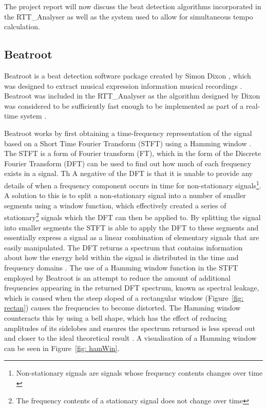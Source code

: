 \documentclass[a4paper, 11pt]{article}
\begin{document}
The project report will now discuss the beat detection algorithms incorporated in the RTT\_Analyser as well as the system used to allow for simultaneous tempo calculation.  

\subsection{Beatroot}
Beatroot is a beat detection software package created by Simon Dixon \cite{dixon1}, which was designed to extract musical expression information musical recordings \cite{dixon3}. Beatroot was included in the RTT{\_}Analyser as the algorithm designed by Dixon was considered to be sufficiently fast enough to be implemented as part of a real-time system \cite{dixon4}.\par

Beatroot works by first obtaining a time-frequency representation of the signal based on a Short Time Fourier Transform (STFT) using a Hamming window \cite{dixon2}. The STFT is a form of Fourier transform (FT), which in the form of the Discrete Fourier Transform (DFT) can be used to find out how much of each frequency exists in a signal. Th A negative of the DFT is that it is unable to provide any details of when a frequency component occurs in time for non-stationary signals\footnote{Non-stationary signals are signals whose frequency contents changes over time \cite{polikapt2}}. A solution to this is to split a non-stationary signal into a number of smaller segments using a window function, which effectively created a series of stationary\footnote{The frequency contents of a stationary signal does not change over time} signals which the DFT can then be applied to. By splitting the signal into smaller segments the STFT is able to apply the DFT to these segments and essentially express a signal as a linear combination of elementary signals that are easily manipulated. The DFT returns a spectrum that contains information about how the energy held within the signal is distributed in the time and frequency domains \cite{tzane2}. The use of a Hamming window function in the STFT employed by Beatroot is an attempt to reduce the amount of additional frequencies appearing in the returned DFT spectrum, known as spectral leakage, which is caused when the steep sloped of a rectangular window (Figure~\ref{fig: rectan}) causes the frequencies to become distorted. The Hamming window counteracts this by using a bell shape, which has the effect of reducing amplitudes of its sidelobes \cite{lyons} and ensures the spectrum returned is less spread out and closer to the ideal theoretical result \cite{tzane2}. A visualisation of a Hamming window can be seen in Figure~\ref{fig: hamWin}. 
\end{document}
